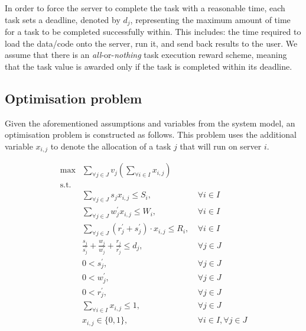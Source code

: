 In order to force the server to complete the task with a reasonable time, each task sets a deadline, denoted by $d_j$,
representing the maximum amount of time for a task to be completed successfully within. This includes: the time
required to load the data/code onto the server, run it, and send back results to the user. We assume that there
is an \emph{all}-or-\emph{nothing} task execution reward scheme, meaning that the task value is awarded only if the
task is completed within its deadline.

\subsection{Optimisation problem}
\label{subsec:optimisation-problem}
Given the aforementioned assumptions and variables from the system model, an optimisation problem is constructed as
follows. This problem uses the additional variable $x_{i,j}$ to denote the allocation of a task $j$ that will run on
server $i$.

\begin{align}
    \max & \sum_{\forall j \in J} v_j \left(\sum_{\forall i \in I} x_{i,j}\right) \label{eq:objective} \\
    \mbox{s.t.} \nonumber \\
    & \sum_{\forall j \in J} s_j x_{i,j} \leq S_i, &~ \forall{i \in I} \label{eq:server-storage-constraint} \\
    & \sum_{\forall j \in J} w^{'}_j x_{i,j} \leq W_i, &~ \forall{i \in I} \label{eq:server-computation-constraint} \\
    & \sum_{\forall j \in J} (r^{'}_j + s^{'}_j) \cdot x_{i,j} \leq R_i, &~ \forall{i \in I} \label{eq:server-bandwidth-constraint} \\
    & \frac{s_j}{s^{'}_j} + \frac{w_j}{w^{'}_j} + \frac{r_j}{r^{'}_j} \leq d_j, &~ \forall{j \in J} \label{eq:task-deadline} \\
    & 0 < s^{'}_j, &~ \forall{j \in J} \label{eq:loading-speeds} \\
    & 0 < w^{'}_j, &~ \forall{j \in J} \label{eq:compute-speeds} \\
    & 0 < r^{'}_j, &~ \forall{j \in J} \label{eq:sending-speeds} \\
    & \sum_{\forall i \in I} x_{i,j} \leq 1, &~ \forall{j \in J} \label{eq:server-task-allocation} \\
    & x_{i,j} \in \{0, 1\}, &~ \forall{i \in I},\forall{j \in J} \label{eq:task-allocation}
\end{align}

